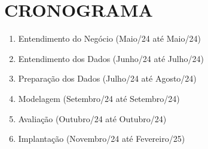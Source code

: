 \documentclass[12pt,a4paper]{article}
\begin{document}
\section{CRONOGRAMA}
\begin{enumerate}
    \item Entendimento do Negócio (Maio/24 até Maio/24)
    \item Entendimento dos Dados (Junho/24 até Julho/24)
    \item Preparação dos Dados 	(Julho/24 até Agosto/24)
    \item Modelagem	(Setembro/24 até Setembro/24)
    \item Avaliação	(Outubro/24 até Outubro/24)
    \item Implantação (Novembro/24 até Fevereiro/25)
\end{enumerate}
\def\refname{REFERÊNCIAS BIBLIOGRÁFICAS}


\end{document}
